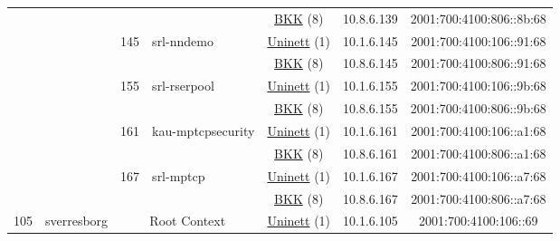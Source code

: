 \begin{small}
\begin{center}
\begin{longtable}{|c|c|c|c|c|c|c|c|}
  &  &  &  & \multicolumn{2}{|c|}{\tiny{\href{http://bkk.no}{BKK} (8)}} & \tiny{10.8.6.139} & \tiny{2001:700:4100:806::8b:68} \\* \cline{3-3}\cline{4-4}\cline{5-5}\cline{6-6}\cline{7-7}\cline{8-8}
  &  & \multirow{2}{*}{\tiny{145}} & \multicolumn{1}{|l|}{\multirow{2}{*}{\tiny{srl-nndemo}}} & \multicolumn{2}{|c|}{\tiny{\href{https://www.uninett.no}{Uninett} (1)}} & \tiny{10.1.6.145} & \tiny{2001:700:4100:106::91:68} \\* \cline{5-5}\cline{6-6}\cline{7-7}\cline{8-8}
  &  &  &  & \multicolumn{2}{|c|}{\tiny{\href{http://bkk.no}{BKK} (8)}} & \tiny{10.8.6.145} & \tiny{2001:700:4100:806::91:68} \\* \cline{3-3}\cline{4-4}\cline{5-5}\cline{6-6}\cline{7-7}\cline{8-8}
  &  & \multirow{2}{*}{\tiny{155}} & \multicolumn{1}{|l|}{\multirow{2}{*}{\tiny{srl-rserpool}}} & \multicolumn{2}{|c|}{\tiny{\href{https://www.uninett.no}{Uninett} (1)}} & \tiny{10.1.6.155} & \tiny{2001:700:4100:106::9b:68} \\* \cline{5-5}\cline{6-6}\cline{7-7}\cline{8-8}
  &  &  &  & \multicolumn{2}{|c|}{\tiny{\href{http://bkk.no}{BKK} (8)}} & \tiny{10.8.6.155} & \tiny{2001:700:4100:806::9b:68} \\* \cline{3-3}\cline{4-4}\cline{5-5}\cline{6-6}\cline{7-7}\cline{8-8}
  &  & \multirow{2}{*}{\tiny{161}} & \multicolumn{1}{|l|}{\multirow{2}{*}{\tiny{kau-mptcpsecurity}}} & \multicolumn{2}{|c|}{\tiny{\href{https://www.uninett.no}{Uninett} (1)}} & \tiny{10.1.6.161} & \tiny{2001:700:4100:106::a1:68} \\* \cline{5-5}\cline{6-6}\cline{7-7}\cline{8-8}
  &  &  &  & \multicolumn{2}{|c|}{\tiny{\href{http://bkk.no}{BKK} (8)}} & \tiny{10.8.6.161} & \tiny{2001:700:4100:806::a1:68} \\* \cline{3-3}\cline{4-4}\cline{5-5}\cline{6-6}\cline{7-7}\cline{8-8}
  &  & \multirow{2}{*}{\tiny{167}} & \multicolumn{1}{|l|}{\multirow{2}{*}{\tiny{srl-mptcp}}} & \multicolumn{2}{|c|}{\tiny{\href{https://www.uninett.no}{Uninett} (1)}} & \tiny{10.1.6.167} & \tiny{2001:700:4100:106::a7:68} \\* \cline{5-5}\cline{6-6}\cline{7-7}\cline{8-8}
  &  &  &  & \multicolumn{2}{|c|}{\tiny{\href{http://bkk.no}{BKK} (8)}} & \tiny{10.8.6.167} & \tiny{2001:700:4100:806::a7:68} \\ \hline
 \multirow{18}{*}{\tiny{105}} & \multicolumn{1}{|l|}{\multirow{18}{*}{\tiny{sverresborg}}} & \multicolumn{2}{|c|}{\multirow{2}{*}{\tiny{Root Context}}} & \multicolumn{2}{|c|}{\tiny{\href{https://www.uninett.no}{Uninett} (1)}} & \tiny{10.1.6.105} & \tiny{2001:700:4100:106::69} \\* \cline{5-5}\cline{6-6}\cline{7-7}\cline{8-8}

\end{longtable}
\end{center}
\end{small}
